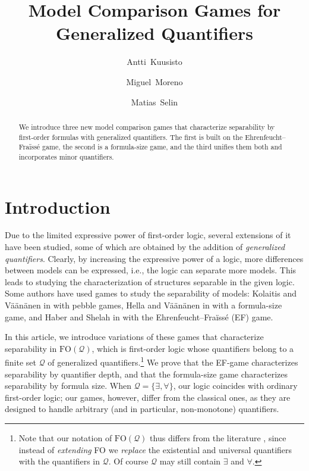 \documentclass{article}
\title{Model Comparison Games for Generalized Quantifiers}
\author[1]{Antti~Kuusisto}
\author[1]{Miguel~Moreno}
\author[1]{Matias~Selin}
\affil[1]{Tampere University, Finland}
\date{}
\theoremstyle{definition}
\begin{document}
\maketitle

\begin{abstract}
    We introduce three new model comparison games that characterize separability by first-order formulas with generalized quantifiers. The first is built on the Ehrenfeucht–Fraïssé game, the second is a formula-size game, and the third unifies them both and incorporates minor quantifiers.
\end{abstract}

\section{Introduction}

Due to the limited expressive power of first-order logic, several extensions of it have been studied, some of which are obtained by the addition of \textit{generalized quantifiers}. Clearly, by increasing the expressive power of a logic, more differences between models can be expressed, i.e., the logic can separate more models. This leads to studying the characterization of structures separable in the given logic. Some authors have used games to study the separability of models: Kolaitis and Väänänen in \cite{MR1336413} with pebble games, Hella and Väänänen in \cite{hellavaananen} with a formula-size game, and Haber and Shelah in \cite{MR3485648} with the Ehrenfeucht--Fraïssé (EF) game.

In this article, we introduce variations of these games that characterize separability in $\mathrm{FO}(\mathcal{Q})$, which is first-order logic whose quantifiers belong to a finite set $\mathcal{Q}$ of generalized quantifiers.\footnote{Note that our notation of $\mathrm{FO}(\mathcal{Q})$ thus differs from the literature \cite{lindstrom1966first, ebbinghaus2005finite}, since instead of \textit{extending} FO we \textit{replace} the existential and universal quantifiers with the quantifiers in $\mathcal{Q}$. Of course $\mathcal{Q}$ may still contain $\exists$ and $\forall$.} We prove that the EF-game characterizes separability by quantifier depth, and that the formula-size game characterizes separability by formula size. When $\mathcal{Q}=\{\exists,\forall\}$, our logic coincides with ordinary first-order logic; our games, however, differ from the classical ones, as they are designed to handle arbitrary (and in particular, non-monotone) quantifiers.
\end{document}

